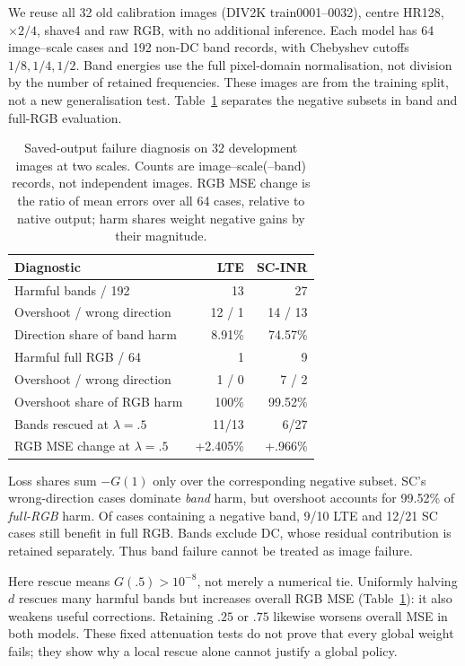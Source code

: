 We reuse all 32 old calibration images (DIV2K train0001--0032), centre
HR128, $\times2/4$, shave4 and raw RGB, with no additional inference.
Each model has 64 image--scale cases and 192 non-DC band records, with
Chebyshev cutoffs $1/8,1/4,1/2$. Band energies use the full pixel-domain
normalisation, not division by the number of retained frequencies. These images are from the training split,
not a new generalisation test. Table~\ref{tab:failures} separates the
negative subsets in band and full-RGB evaluation.

\begin{table}[t]\centering
\caption{Saved-output failure diagnosis on 32 development images at two
scales. Counts are image--scale(--band) records, not independent images.
RGB MSE change is the ratio of mean errors over all 64 cases, relative
to native output; harm shares weight negative gains by their magnitude.}
\label{tab:failures}
\begin{tabular}{lrr}\toprule
Diagnostic & LTE & SC-INR\\\midrule
Harmful bands / 192 & 13 & 27\\
\quad Overshoot / wrong direction & 12 / 1 & 14 / 13\\
Direction share of band harm & 8.91\% & 74.57\%\\
Harmful full RGB / 64 & 1 & 9\\
\quad Overshoot / wrong direction & 1 / 0 & 7 / 2\\
Overshoot share of RGB harm & 100\% & 99.52\%\\\midrule
Bands rescued at $\lambda=.5$ & 11/13 & 6/27\\
RGB MSE change at $\lambda=.5$ & +2.405\% & +.966\%\\\bottomrule
\end{tabular}
\end{table}

Loss shares sum $-G(1)$ only over the corresponding negative subset.
SC's wrong-direction cases dominate \emph{band} harm, but overshoot
accounts for 99.52\% of \emph{full-RGB} harm. Of cases containing a
negative band, 9/10 LTE and 12/21 SC cases still benefit in full RGB.
Bands exclude DC, whose residual contribution is retained separately.
Thus band failure cannot be treated as image failure.

Here rescue means $G(.5)>10^{-8}$, not merely a numerical tie.
Uniformly halving $d$ rescues many harmful bands but increases overall
RGB MSE (Table~\ref{tab:failures}): it also weakens useful corrections.
Retaining $.25$ or $.75$ likewise worsens overall MSE in both models.
These fixed attenuation tests do not prove that every global weight
fails; they show why a local rescue alone cannot justify a global policy.


